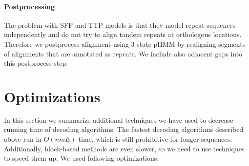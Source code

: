 \paragraph{Postprocessing}
The problem with SFF and TTP models is that they model repeat sequences
independently and do not try to align tandem repeats at orthologous locations.
Therefore we postprocess alignment using 3-state pHMM by realigning segments of
alignments that are annotated as repeats. We include also adjacent gaps into
this postprocess step.

\section{Optimizations}

In this section we summarize additional techniques we have used to decrease
running time of decoding algorithms. The fastest decoding algorithms described
above run in $O(nmE)$ time, which is still prohibitive for longer sequences.
Additionally, block-based methods are even slower, so we need to use techniques
to speed them up. We used following optimizations:
